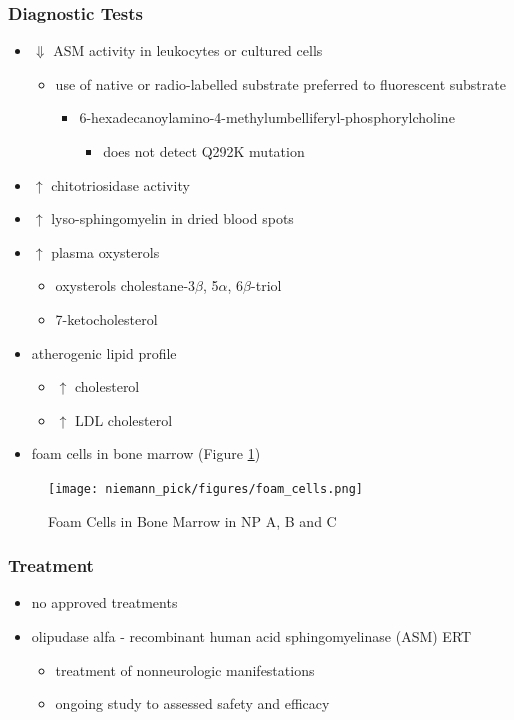 \documentclass[12pt]{scrartcl}
\begin{document}
\subsubsection{Diagnostic Tests}
\label{sec:orgbf394f6}
\begin{itemize}
\item \(\Downarrow\) ASM activity in leukocytes or cultured cells
\begin{itemize}
\item use of native or radio-labelled substrate preferred to fluorescent substrate
\begin{itemize}
\item 6-hexadecanoylamino-4-methylumbelliferyl-phosphorylcholine
\begin{itemize}
\item does not detect Q292K mutation
\end{itemize}
\end{itemize}
\end{itemize}
\item \(\uparrow\) chitotriosidase activity
\item \(\uparrow\) lyso-sphingomyelin in dried blood spots
\item \(\uparrow\) plasma oxysterols
\begin{itemize}
\item oxysterols cholestane-3\(\beta\), 5\(\alpha\), 6\(\beta\)-triol
\item 7-ketocholesterol
\end{itemize}
\item atherogenic lipid profile 
\begin{itemize}
\item \(\uparrow\) cholesterol
\item \(\uparrow\) LDL cholesterol
\end{itemize}
\item foam cells in bone marrow (Figure \ref{fig:orgd394ad7})
\end{itemize}

\begin{figure}[htbp]
\centering
\texttt{[image: niemann\_pick/figures/foam\_cells.png]}
\caption{\label{fig:orgd394ad7}Foam Cells in Bone Marrow in NP A, B and C}
\end{figure}

\subsubsection{Treatment}
\label{sec:orgb06a949}
\begin{itemize}
\item no approved treatments
\item olipudase alfa - recombinant human acid sphingomyelinase (ASM) ERT
\begin{itemize}
\item treatment of nonneurologic manifestations
\item ongoing study to assessed safety and efficacy
\end{itemize}
\end{itemize}
\end{document}
